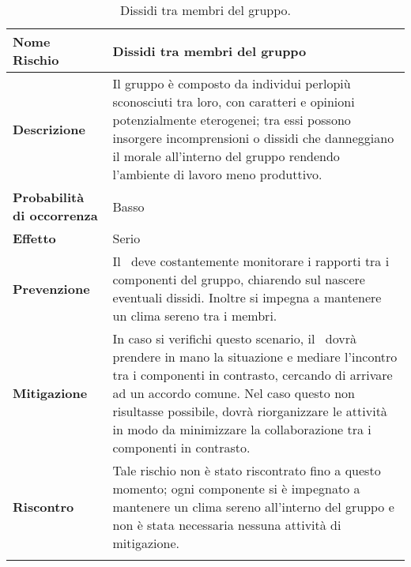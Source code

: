 \documentclass[../PianoDiProgetto.tex]{subfiles}
\begin{document}
		\begin{table}[H]
				\center
				\begin{tabularx}{\textwidth}{X X}
					\noalign{\hrule height 1.5pt}
					\textbf{Nome Rischio} &  Dissidi tra membri del gruppo \\
					\hline
					\textbf{Descrizione}  &  Il gruppo è composto da individui perlopiù sconosciuti tra loro, con caratteri e opinioni potenzialmente eterogenei; tra essi possono insorgere
incomprensioni o dissidi che danneggiano il morale all'interno del gruppo rendendo l'ambiente
di lavoro meno produttivo. \\
					\hline
					\textbf{Probabilità di occorrenza}  & Basso \\
					\hline
					\textbf{Effetto}  &  Serio \\
					\hline
					\textbf{Prevenzione}  & Il \responsabilediprogetto\ deve costantemente
monitorare i rapporti tra i componenti del gruppo, chiarendo sul nascere eventuali dissidi. Inoltre si impegna a mantenere un clima sereno tra i membri.  \\
					\hline
					\textbf{Mitigazione}  & In caso si verifichi questo scenario, il \responsabilediprogetto\ dovrà prendere in mano la situazione e mediare l'incontro tra i componenti
in contrasto, cercando di arrivare ad un accordo
comune. Nel caso questo non risultasse possibile, dovrà riorganizzare le attività in modo da
minimizzare la collaborazione tra i componenti in contrasto.  \\
					\hline
					\textbf{Riscontro} & Tale rischio non è stato riscontrato fino a questo momento; ogni componente si è impegnato a mantenere un clima sereno all'interno del gruppo e non è stata necessaria nessuna attività di mitigazione. \\
					\noalign{\hrule height 1.5pt}
			\end{tabularx}
			\caption{Dissidi tra membri del gruppo.  \label{tab:table_label}}
		\end{table}
		
\end{document}
